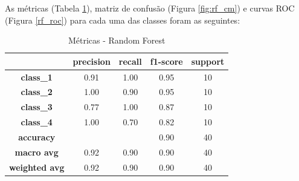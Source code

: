 \documentclass[
	article,			%
	11pt,				%
	oneside,			%
	a4paper,			%
	english,			%
	brazil,				%
	sumario=tradicional
	]{abntex2}
\begin{document}
As métricas (Tabela \ref{tab:rf_01}), matriz de confusão (Figura \ref{fig:rf_cm}) e curvas ROC (Figura \ref{rf_roc}) para cada uma das classes foram as seguintes:

\begin{table}[]
\centering
\begin{tabular}{c|c|c|c|c|}
\cline{2-5}
                                            & \textbf{precision} & \textbf{recall} & \textbf{f1-score} & \textbf{support} \\ \hline
\multicolumn{1}{|c|}{\textbf{class\_1}}     & 0.91               & 1.00            & 0.95              & 10               \\ \hline
\multicolumn{1}{|c|}{\textbf{class\_2}}     & 1.00               & 0.90            & 0.95              & 10               \\ \hline
\multicolumn{1}{|c|}{\textbf{class\_3}}     & 0.77               & 1.00            & 0.87              & 10               \\ \hline
\multicolumn{1}{|c|}{\textbf{class\_4}}     & 1.00               & 0.70            & 0.82              & 10               \\ \hline
\multicolumn{1}{|c|}{\textbf{accuracy}}     &                    &                 & 0.90              & 40               \\ \hline
\multicolumn{1}{|c|}{\textbf{macro avg}}    & 0.92               & 0.90            & 0.90              & 40               \\ \hline
\multicolumn{1}{|c|}{\textbf{weighted avg}} & 0.92               & 0.90            & 0.90              & 40               \\ \hline
\end{tabular}
\caption{Métricas - Random Forest }
\label{tab:rf_01}
\end{table}
\end{document}
